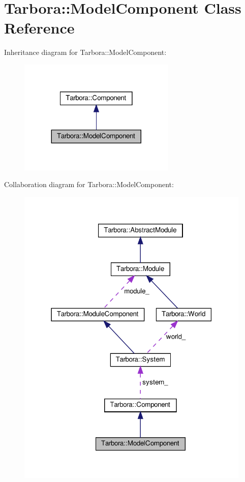 \hypertarget{classTarbora_1_1ModelComponent}{}\section{Tarbora\+:\+:Model\+Component Class Reference}
\label{classTarbora_1_1ModelComponent}


Inheritance diagram for Tarbora\+:\+:Model\+Component\+:
\nopagebreak
\begin{figure}[H]
\begin{center}
\leavevmode
\includegraphics[width=212pt]{classTarbora_1_1ModelComponent__inherit__graph}
\end{center}
\end{figure}


Collaboration diagram for Tarbora\+:\+:Model\+Component\+:
\nopagebreak
\begin{figure}[H]
\begin{center}
\leavevmode
\includegraphics[width=316pt]{classTarbora_1_1ModelComponent__coll__graph}
\end{center}
\end{figure}
